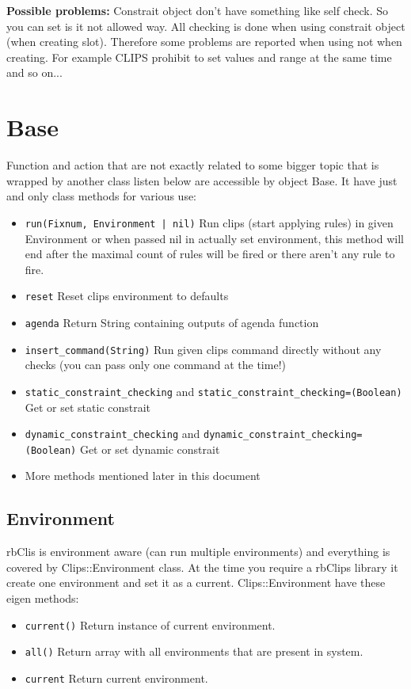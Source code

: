 \documentclass[a4paper,10pt]{article}
\begin{document}
\textbf{Possible problems:} Constrait object don't have something like self check. So you can set is it not allowed way. All checking is done when using constrait object (when creating slot). Therefore some problems are reported when using not when creating. For example CLIPS prohibit to set values and range at the same time and so on...

\section{Base}
Function and action that are not exactly related to some bigger topic that is wrapped by another class listen below are accessible by object Base. It have just and only class methods for various use:
\begin{itemize}
 \item \texttt{run(Fixnum, Environment | nil)} Run clips (start applying rules) in given Environment or when passed nil in actually set environment, this method will end after the maximal count of rules will be fired or there aren't any rule to fire.
 \item \texttt{reset} Reset clips environment to defaults
 \item \texttt{agenda} Return String containing outputs of agenda function
 \item \texttt{insert\_command(String)} Run given clips command directly without any checks (you can pass only one command at the time!)
 \item \texttt{static\_constraint\_checking} and \texttt{static\_constraint\_checking=(Boolean)} Get or set static constrait
 \item \texttt{dynamic\_constraint\_checking} and \texttt{dynamic\_constraint\_checking=(Boolean)} Get or set dynamic constrait
 \item More methods mentioned later in this document
\end{itemize}

\subsection{Environment}
rbClis is environment aware (can run multiple environments) and everything is covered by Clips::Environment class. At the time you require a rbClips library it create one environment and set it as a current. Clips::Environment have these eigen methods:
\begin{itemize}
 \item \texttt{current()} Return instance of current environment.
 \item \texttt{all()} Return array with all environments that are present in system.
 \item \texttt{current} Return current environment.
\end{itemize}
\end{document}
